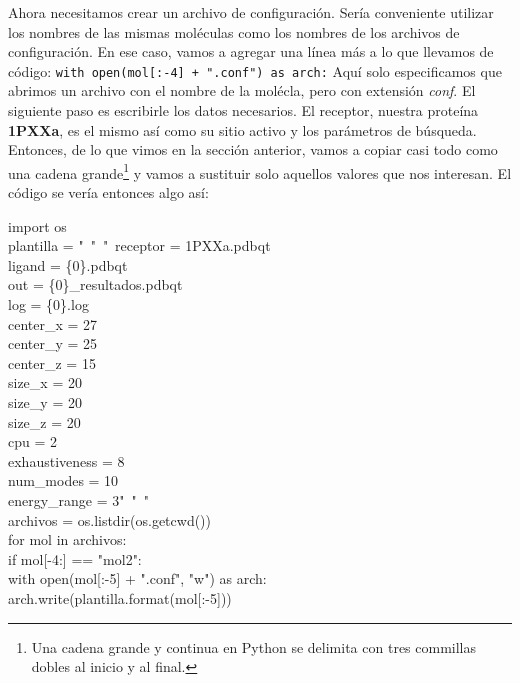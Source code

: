 \documentclass[10pt,letterpaper]{article}
\newcommand{\inlinecode}[1]{
\colorbox{light-gray}{\texttt{#1}}
}
\newenvironment{Code}
{
\begin{lrbox}{\selvestebox}%
\begin{minipage}{\dimexpr\columnwidth-2\fboxsep\relax}
\fontfamily{\ttdefault}\selectfont
}
{\end{minipage}\end{lrbox}%
\begin{center}
\colorbox{light-gray}{\usebox{\selvestebox}}
\end{center}
}
\begin{document}
Ahora necesitamos crear un archivo de configuraci\'on. Ser\'ia conveniente utilizar los nombres de las mismas mol\'eculas como los nombres de los archivos de configuraci\'on. En ese caso, vamos a agregar una l\'inea m\'as a lo que llevamos de c\'odigo: \inlinecode{with open(mol[:-4] + ".conf") as arch:} Aqu\'i solo especificamos que abrimos un archivo con el nombre de la mol\'ecla, pero con extensi\'on \emph{conf}. El siguiente paso es escribirle los datos necesarios. El receptor, nuestra prote\'ina \textbf{1PXXa}, es el mismo as\'i como su sitio activo y los par\'ametros de b\'usqueda. Entonces, de lo que vimos en la secci\'on anterior, vamos a copiar casi todo como una cadena grande\footnote{Una cadena grande y continua en Python se delimita con tres commillas dobles al inicio y al final.} y vamos a sustituir solo aquellos valores que nos interesan. El c\'odigo se ver\'ia entonces algo as\'i:

\begin{footnotesize}
\begin{Code}
import os\\
plantilla = "\ \hspace*{-1.5mm}"\ \hspace*{-1.5mm}"\ \hspace*{-1.5mm}receptor = 1PXXa.pdbqt\\
ligand = \{0\}.pdbqt\\
out = \{0\}\_resultados.pdbqt\\
log = \{0\}.log\\
center\_x = 27\\
center\_y = 25\\
center\_z = 15\\
size\_x = 20\\
size\_y = 20\\
size\_z = 20\\
cpu = 2\\
exhaustiveness = 8\\
num\_modes = 10\\
energy\_range = 3"\ \hspace*{-1.5mm}"\ \hspace*{-1.5mm}"\\
archivos = os.listdir(os.getcwd())\\
for mol in archivos:\\
\hspace*{6mm}if mol[-4:] == "mol2":\\
\hspace*{12mm}with open(mol[:-5] + ".conf", "w") as arch:\\
\hspace*{18mm}arch.write(plantilla.format(mol[:-5]))
\end{Code}
\end{footnotesize}
\end{document}
